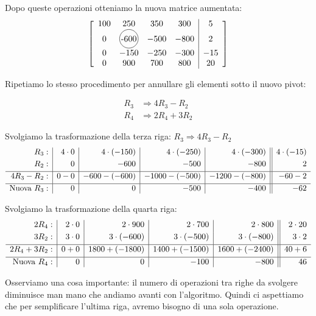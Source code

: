 Dopo queste operazioni otteniamo la nuova matrice aumentata:
\begin{equation}
\left[
\begin{array}{cccc|c}
100 & 250 & 350 & 300 & 5 \\
0   & \tikz[baseline=(char.base)]{\node[draw,circle,inner sep=1pt] (char) {-600};} & -500 & -800 & 2 \\
0   & -150 & -250 & -300 & -15 \\
0   & 900  & 700  & 800  & 20
\end{array}
\right]
\label{mat: dopo primo pivot}
\end{equation}

Ripetiamo lo stesso procedimento per annullare gli elementi sotto il nuovo pivot:

\begin{equation}
\begin{aligned}
R_3 &\Rightarrow 4 R_3 - R_2 \\
R_4 &\Rightarrow 2 R_4 + 3 R_2
\end{aligned}
\end{equation}


Svolgiamo la trasformazione della terza riga: $R_3 \Rightarrow 4R_3 - R_2$
\[
\begin{array}{r | r | r | r | r || r}
R_3: & 4\cdot0 & 4\cdot(-150) & 4\cdot(-250) & 4\cdot(-300) & 4\cdot(-15) \\[1mm]
R_2: & 0 & -600 & -500 & -800 & 2 \\[1mm]
\hline
4R_3 - R_2: & 0-0 & -600-(-600) & -1000-(-500) & -1200-(-800) & -60-2 \\[1mm]
\hline
\text{Nuova }R_3: & 0 & 0 & -500 & -400 & -62
\end{array}
\]
\vspace{0.5cm}


Svolgiamo la trasformazione della quarta riga: 
\[
\begin{array}{r | r | r | r | r || r}
2R_4: & 2\cdot0 & 2\cdot900 & 2\cdot700 & 2\cdot800 & 2\cdot20 \\[1mm]
3R_2: & 3\cdot0 & 3\cdot(-600) & 3\cdot(-500) & 3\cdot(-800) & 3\cdot2 \\[1mm]
\hline
2R_4 + 3R_2: & 0+0 & 1800+(-1800) & 1400+(-1500) & 1600+(-2400) & 40+6 \\[1mm]
\hline
\text{Nuova }R_4: & 0 & 0 & -100 & -800 & 46
\end{array}
\]

Osserviamo una cosa importante: il numero di operazioni tra righe da svolgere diminuisce man mano che andiamo avanti con l'algoritmo. Quindi ci aspettiamo che per semplificare l'ultima riga, avremo bisogno di una sola operazione.

